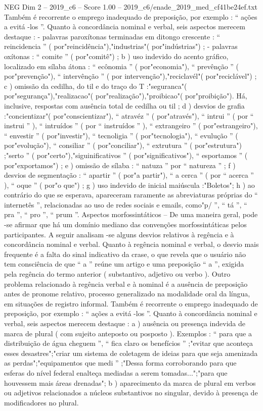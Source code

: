 \begin{textsample}{NEG Dim 2 – 2019\_c6 – Score 1.00 – 2019\_c6/enade\_2019\_med\_cf41be24ef.txt}
Também é recorrente o emprego inadequado de preposição, por exemplo : “ ações a evitá -los ”.
Quanto à concordância nominal e verbal, seis aspectos merecem destaque : - palavras paroxítonas terminadas em ditongo crescente : “ reincidencia ” ( por"reincidência"),"industrias"( por"indústrias") ; - palavras oxítonas : “ comite ” ( por"comitê") ; b ) uso indevido do acento gráfico, localizado em sílaba átona : “ ecônomia ” ( por"economia"), “ prevênção ” ( por"prevenção"), “ intervênção ” ( por intervenção"),"reciclavél"( por"reciclável") ; c ) omissão da cedilha, do til e do traço do T :"seguranca"( por"segurança"),"realizacao"( por"realização"),"proibicao"( por"proibição").
Há, inclusive, respostas com ausência total de cedilha ou til ; d ) desvios de grafia :"concientizar"( por"conscientizar"), “ atravéz ” ( por"através"), “ intrui ” ( por “ instrui ” ), “ intruídos ” ( por “ instruídos ” ), “ extrangeiro ” ( por"estrangeiro"), “ envestir ” ( por"investir"), “ tecnoligia ” ( por"tecnologia"), “ evulução ” ( por"evolução"), “ consiliar ” ( por"conciliar"), “ extrutura ” ( por"estrutura") ;"serto ” ( por"certo"),"siguinificativos ” ( por"significativos"), “ esportamos ” ( por"exportamos") ; e ) omissão de sílaba : “ natuza ” por “ natureza ” ; f ) desvios de segmentação : “ apartir ” ( por"a partir"), “ a cerca ” ( por “ acerca ” ), “ oque ” ( por"o que") ; g ) uso indevido de inicial maiúscula :"Boletos"; h ) ao contrário do que se esperava, apareceram raramente as abreviaturas próprias do “ internetês ”, relacionadas ao uso de redes sociais e emails, como"p/ ”, “ tá ”, “ pra ”, “ pro ”, “ prum ”.
Aspectos morfossintáticos – De uma maneira geral, pode -se afirmar que há um domínio mediano das convenções morfossintáticas pelos participantes.
A seguir analisam -se alguns desvios relativos à regência e à concordância nominal e verbal.
Quanto à regência nominal e verbal, o desvio mais frequente é a falta do sinal indicativo da crase, o que revela que o usuário não tem consciência de que “ a ” reúne um artigo e uma preposição “ a ”, exigida pela regência do termo anterior ( substantivo, adjetivo ou verbo ).
Outro problema relacionado à regência verbal e à nominal é a ausência de preposição antes de pronome relativo, processo generalizado na modalidade oral da língua, em situações de registro informal.
Também é recorrente o emprego inadequado de preposição, por exemplo : “ ações a evitá -los ”.
Quanto à concordância nominal e verbal, seis aspectos merecem destaque : a ) ausência ou presença indevida de marca de plural ( com sujeito anteposto ou posposto ).
Exemplos : “ para que a distribuição de água cheguem ”, “ fica claro os benefícios ” ;"evitar que aconteça esses desastres";"criar um sistema de coletagem de ideias para que seja amenizada as perdas";"equipamentos que medi ” ;"Dessa forma corroborando para que esferas do nível federal enalteça mediadas a serem tomadas...";"para que houvessem mais áreas drenadas"; b ) aparecimento da marca de plural em verbos ou adjetivos relacionados a núcleos substantivos no singular, devido à presença de modificadores no plural.

\end{textsample}
